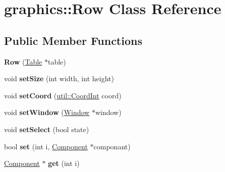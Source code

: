 \hypertarget{classgraphics_1_1_row}{\section{graphics\-:\-:Row Class Reference}
\label{classgraphics_1_1_row}
}
\subsection*{Public Member Functions}
\begin{DoxyCompactItemize}
\item 
\hypertarget{classgraphics_1_1_row_a5bf9ecfde3dfba39a0c84938af79682e}{{\bfseries Row} (\hyperlink{classgraphics_1_1_table}{Table} $\ast$table)}\label{classgraphics_1_1_row_a5bf9ecfde3dfba39a0c84938af79682e}

\item 
\hypertarget{classgraphics_1_1_row_ac58c44fc95d60c2b434192d508784353}{void {\bfseries set\-Size} (int width, int height)}\label{classgraphics_1_1_row_ac58c44fc95d60c2b434192d508784353}

\item 
\hypertarget{classgraphics_1_1_row_a9da1955b838e1c6da9aa8f1aea84bc9b}{void {\bfseries set\-Coord} (\hyperlink{classutil_1_1_coordinates}{util\-::\-Coord\-Int} coord)}\label{classgraphics_1_1_row_a9da1955b838e1c6da9aa8f1aea84bc9b}

\item 
\hypertarget{classgraphics_1_1_row_a46b4dc01867e1e36408a68d63c7f1e9d}{void {\bfseries set\-Window} (\hyperlink{classgraphics_1_1_window}{Window} $\ast$window)}\label{classgraphics_1_1_row_a46b4dc01867e1e36408a68d63c7f1e9d}

\item 
\hypertarget{classgraphics_1_1_row_a823f845ab6f36f3f9c6225072a56ac3e}{void {\bfseries set\-Select} (bool state)}\label{classgraphics_1_1_row_a823f845ab6f36f3f9c6225072a56ac3e}

\item 
\hypertarget{classgraphics_1_1_row_a0107894050d1e90c09b4ae8c4ed3bd50}{bool {\bfseries set} (int i, \hyperlink{classgraphics_1_1_component}{Component} $\ast$componant)}\label{classgraphics_1_1_row_a0107894050d1e90c09b4ae8c4ed3bd50}

\item 
\hypertarget{classgraphics_1_1_row_a9c957a2a76760b7b3bccd43f2c7f98f8}{\hyperlink{classgraphics_1_1_component}{Component} $\ast$ {\bfseries get} (int i)}\label{classgraphics_1_1_row_a9c957a2a76760b7b3bccd43f2c7f98f8}


\end{DoxyCompactItemize}
